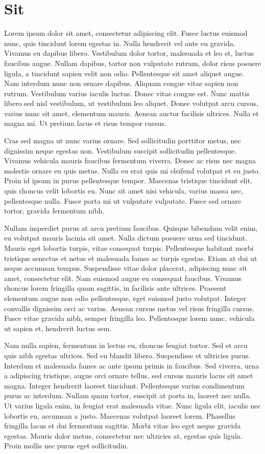 \chapter{Sit}

Lorem ipsum dolor sit amet, consectetur adipiscing elit. Fusce luctus
euismod nunc, quis tincidunt lorem egestas in. Nulla hendrerit vel
ante eu gravida. Vivamus eu dapibus libero. Vestibulum dolor tortor,
malesuada et leo et, luctus faucibus augue. Nullam dapibus, tortor non
vulputate rutrum, dolor risus posuere ligula, a tincidunt sapien velit
non odio. Pellentesque sit amet aliquet augue. Nam interdum nunc non
ornare dapibus. Aliquam congue vitae sapien non rutrum. Vestibulum
varius iaculis luctus. Donec vitae congue est. Nunc mattis libero sed
nisl vestibulum, ut vestibulum leo aliquet. Donec volutpat arcu
cursus, varius nunc sit amet, elementum mauris. Aenean auctor
facilisis ultrices. Nulla et magna mi. Ut pretium lacus et risus
tempor cursus.

 Cras sed magna ut nunc varius ornare. Sed sollicitudin porttitor
 metus, nec dignissim neque egestas non. Vestibulum suscipit
 sollicitudin pellentesque. Vivamus vehicula mauris faucibus fermentum
 viverra. Donec ac risus nec magna molestie ornare eu quis metus.
 Nulla eu erat quis mi eleifend volutpat et eu justo. Proin id ipsum
 in purus pellentesque tempor. Maecenas tristique tincidunt elit, quis
 rhoncus velit lobortis eu. Nunc sit amet nisi vehicula, varius massa
 nec, pellentesque nulla. Fusce porta mi ut vulputate vulputate. Fusce
 sed ornare tortor, gravida fermentum nibh.

Nullam imperdiet purus at arcu pretium faucibus. Quisque bibendum
velit enim, eu volutpat mauris lacinia sit amet. Nulla dictum posuere
urna sed tincidunt. Mauris eget lobortis turpis, vitae consequat
turpis. Pellentesque habitant morbi tristique senectus et netus et
malesuada fames ac turpis egestas. Etiam at dui ut neque accumsan
tempus. Suspendisse vitae dolor placerat, adipiscing nunc sit amet,
consectetur elit. Nam euismod augue eu consequat faucibus. Vivamus
rhoncus lorem fringilla quam sagittis, in facilisis ante ultrices.
Praesent elementum augue non odio pellentesque, eget euismod justo
volutpat. Integer convallis dignissim orci ac varius. Aenean cursus
metus vel risus fringilla cursus. Fusce vitae gravida nibh, semper
fringilla leo. Pellentesque lorem nunc, vehicula ut sapien et,
hendrerit luctus sem.

Nam nulla sapien, fermentum in lectus eu, rhoncus feugiat tortor. Sed
et arcu quis nibh egestas ultrices. Sed eu blandit libero. Suspendisse
et ultricies purus. Interdum et malesuada fames ac ante ipsum primis
in faucibus. Sed viverra, urna a adipiscing tristique, augue orci
ornare tellus, sed cursus mauris lacus sit amet magna. Integer
hendrerit laoreet tincidunt. Pellentesque varius condimentum purus ac
interdum. Nullam quam tortor, suscipit at porta in, laoreet nec nulla.
Ut varius ligula enim, in feugiat erat malesuada vitae. Nunc ligula
elit, iaculis nec lobortis eu, accumsan a justo. Maecenas volutpat
laoreet lorem. Phasellus fringilla lacus et dui fermentum sagittis.
Morbi vitae leo eget neque gravida egestas. Mauris dolor metus,
consectetur nec ultricies at, egestas quis ligula. Proin mollis nec
purus eget sollicitudin.

